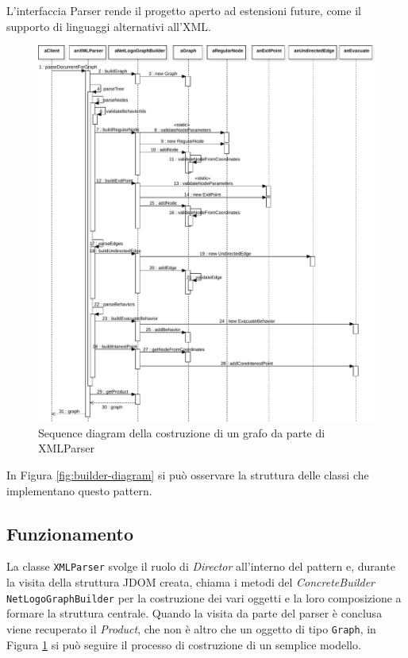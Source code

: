 L'interfaccia Parser rende il progetto aperto ad estensioni future, come il supporto di linguaggi alternativi all'XML.

\begin{figure}[htbp]
\centering
\includegraphics[width=\textwidth,height=\textheight,keepaspectratio]{images/builder-sequence.pdf}
\caption{Sequence diagram della costruzione di un grafo da parte di XMLParser}
\label{fig:builder-sequence}
\end{figure}

In Figura \ref{fig:builder-diagram} si può osservare la struttura delle classi che implementano questo pattern.

\subsection{Funzionamento}
La classe \texttt{XMLParser} svolge il ruolo di \textit{Director} all'interno del pattern e, durante la visita della struttura JDOM \cite{jdom} creata, chiama i metodi del \textit{ConcreteBuilder} \texttt{NetLogoGraphBuilder} per la costruzione dei vari oggetti e la loro composizione a formare la struttura centrale. Quando la visita da parte del parser è conclusa viene recuperato il \textit{Product}, che non è altro che un oggetto di tipo \texttt{Graph}, in Figura \ref{fig:builder-sequence} si può seguire il processo di costruzione di un semplice modello.

